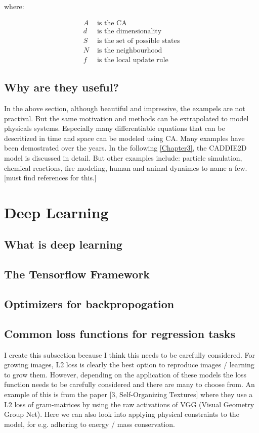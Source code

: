 where:

\begin{align*}
	A &  \text{ is the CA} \\
	d &  \text{ is the dimensionality} \\
	S &  \text{ is the set of possible states} \\
	N &  \text{ is the neighbourhood} \\
	f &  \text{ is the local update rule}
\end{align*}


\subsection{Why are they useful?}
In the above section, although beautiful and impressive, the exampels are not practival. But the same motivation and methods can be extrapolated to model physicals systems. Especially many differentiable equations that can be descritized in time and space can be modeled using CA. Many examples have been demostrated over the years. In the following \ref{Chapter3}, the CADDIE2D model is discussed in detail. But other examples include: particle simulation, chemical reactions, fire modeling, human and animal dynaimcs to name a few. [must find references for this.]

\section{Deep Learning}
\subsection{What is deep learning}
\subsection{The Tensorflow Framework}
\subsection{Optimizers for backpropogation}
\subsection{Common loss functions for regression tasks}
I create this subsection because I think this needs to be carefully considered. For growing images, L2
loss is clearly the best option to reproduce images / learning to grow them. However, depending on
the application of these models the loss function needs to be carefully considered and there are many
to choose from. An example of this is from the paper [3, Self-Organizing Textures] where they use a
L2 loss of gram-matrices by using the raw activations of VGG (Visual Geometry Group Net).
Here we can also look into applying physical constraints to the model, for e.g. adhering to energy
/ mass conservation.
